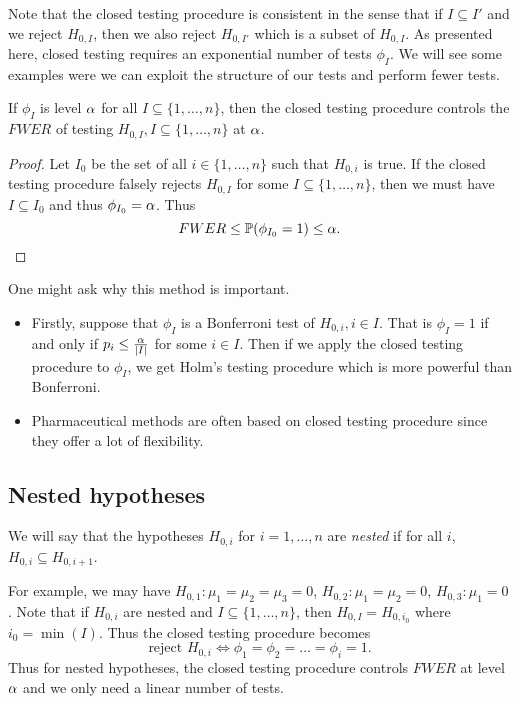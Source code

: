 Note that the closed testing procedure is consistent in the sense that if $I \subseteq I'$ and we reject $H_{0,I}$, then we also reject $H_{0,I'}$ which is a subset of $H_{0,I}$. As presented here, closed testing requires an exponential number of tests $\phi_I$. We will see some examples were we can exploit the structure of our tests and perform fewer tests.
\begin{prop}
    If $\phi_I$ is level ${\alpha}$ for all $I \subseteq \{1,\ldots,n\}$, then the closed testing procedure controls the $FWER$ of testing $H_{0,I}, I \subseteq \{1,\ldots, n\}$ at ${\alpha}$.
\end{prop}
\begin{proof}
    Let $I_0$ be the set of all $i\in \{1,\ldots,n\}$ such that $H_{0,i}$ is true. If the closed testing procedure falsely rejects $H_{0,I}$ for some $I\subseteq \{1,\ldots,n\}$, then we must have $I \subseteq I_0$ and thus $\phi_{I_0}={\alpha}$. Thus
    \[FWER \le {\mathbb{P}}(\phi_{I_0}=1) \le {\alpha}.\qedhere\] 
\end{proof}
\begin{remark}
    One might ask why this method is important.
    \begin{itemize}
        \item Firstly, suppose that $\phi_I$ is a Bonferroni test of $H_{0,i},i \in I$. That is $\phi_I=1$ if and only if $p_i \le \frac{{\alpha}}{{\left\lvert I\right\rvert}}$ for some $i \in I$. Then if we apply the closed testing procedure to $\phi_I$, we get Holm's testing procedure which is more powerful than Bonferroni.
        \item Pharmaceutical methods are often based on closed testing procedure since they offer a lot of flexibility. 
    \end{itemize}
\end{remark}
\subsection{Nested hypotheses}
\begin{defn}
 We will say that the hypotheses $H_{0,i}$ for $i=1,\ldots,n$ are \emph{nested} if for all $i$, $H_{0,i}\subseteq H_{0,i+1}$.
\end{defn} 
For example, we may have $H_{0,1}:\mu_1=\mu_2=\mu_3=0$, $H_{0,2} :\mu_1=\mu_2=0$, $H_{0,3}:\mu_1=0$. Note that if $H_{0,i}$ are nested and $I \subseteq \{1,\ldots,n\}$, then $H_{0,I}=H_{0,i_0}$ where $i_0=\min(I)$. Thus the closed testing procedure becomes
\[\text{reject $H_{0,i}$} \Longleftrightarrow \phi_1=\phi_2=\ldots=\phi_i = 1. \]
Thus for nested hypotheses, the closed testing procedure controls $FWER$ at level ${\alpha}$ and we only need a linear number of tests.
